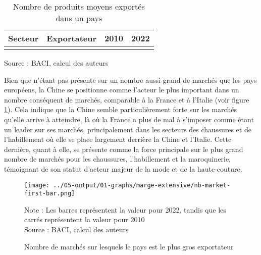 \documentclass[french,10pt,a4paper]{article}
\begin{document}
\begin{table}[ht]
  \centering
  \begin{tabular}{lrrr}
    \hline
   Secteur & Exportateur & 2010 & 2022 \\
    \hline
    \\
    \hline
  \end{tabular}
  \captionsetup{justification=raggedright,singlelinecheck=false, font=small}
  \caption*{Source : BACI, calcul des auteurs}
  \captionsetup{justification=centering, singlelinecheck=true, font=normalsize}
  \caption{Nombre de produits moyens exportés dans un pays}
  \label{tab:table-nb-mean-product-export}
\end{table}

Bien que n'étant pas présente sur un nombre aussi grand de marchés que les pays européens, la Chine se positionne comme l'acteur le plus important dans un nombre conséquent de marchés, comparable à la France et à l'Italie (voir figure \ref{fig:nb-market-first-bar}). Cela indique que la Chine semble particulièrement forte sur les marchés qu'elle arrive à atteindre, là où la France a plus de mal à s'imposer comme étant un leader sur ses marchés, principalement dans les secteurs des chaussures et de l'habillement où elle se place largement derrière la Chine et l'Italie. Cette dernière, quant à elle, se présente comme la force principale sur le plus grand nombre de marchés pour les chaussures, l'habillement et la maroquinerie, témoignant de son statut d'acteur majeur de la mode et de la haute-couture.


\begin{figure}[!h]
  \centering  \texttt{[image: ../05-output/01-graphs/marge-extensive/nb-market-first-bar.png]}
  \captionsetup{justification=justified, singlelinecheck=false, font=small}
  \caption*{Note : Les barres représentent la valeur pour 2022, tandis que les carrés représentent la valeur pour 2010 \\
  Source : BACI, calcul des auteurs}
  \captionsetup{justification=centering, singlelinecheck=true, font=normalsize}
  \caption{Nombre de marchés sur lesquels le pays est le plus gros exportateur}
  \label{fig:nb-market-first-bar}
\end{figure}

\medskip
\end{document}
